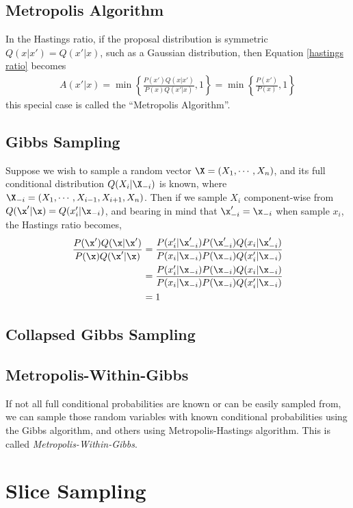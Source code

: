 \documentclass{book}
\begin{document}
\subsection{Metropolis Algorithm}
In the Hastings ratio, if the proposal distribution is symmetric $Q(x|x') = Q(x'|x)$, such as a Gaussian distribution, then Equation \ref{hastings ratio} becomes
\begin{align}
	A(x'|x) = \min \left\{ \frac{P(x')Q(x|x')}{P(x)Q(x'|x)}, 1 \right\} = \min \left\{ \frac{P(x')}{P(x)}, 1 \right\}
\end{align}
this special case is called the ``Metropolis Algorithm''.

\subsection{Gibbs Sampling}
Suppose we wish to sample a random vector $\X = (X_1,\cdots,X_n)$, and its full conditional distribution $Q(X_i|\X_{-i})$ is known, where $\X_{-i} = (X_1,\cdots,X_{i-1},X_{i+1},X_n)$. Then if we sample $X_i$ component-wise from $Q(\x'|\x) = Q(x_i'|\x_{-i})$, and bearing in mind that $\x'_{-i} = \x_{-i}$ when sample $x_i$, the Hastings ratio becomes,
\begin{align}
	\frac{P(\x')Q(\x|\x')}{P(\x)Q(\x'|\x)} &= \frac{P(x_i'|\x'_{-i})P(\x'_{-i})Q(x_i|\x'_{-i})}{P(x_i|\x_{-i})P(\x_{-i})Q(x_i'|\x_{-i})}\\
	&= \frac{P(x_i'|\x_{-i})P(\x_{-i})Q(x_i|\x_{-i})}{P(x_i|\x_{-i})P(\x_{-i})Q(x_i'|\x_{-i})}\\	
	&= 1
\end{align}

\subsection{Collapsed Gibbs Sampling}

\subsection{Metropolis-Within-Gibbs}
If not all full conditional probabilities are known or can be easily sampled from, we can sample those random variables with known conditional probabilities using the Gibbs algorithm, and others using Metropolis-Hastings algorithm. This is called {\em{Metropolis-Within-Gibbs}}.

\section{Slice Sampling}
\end{document}
